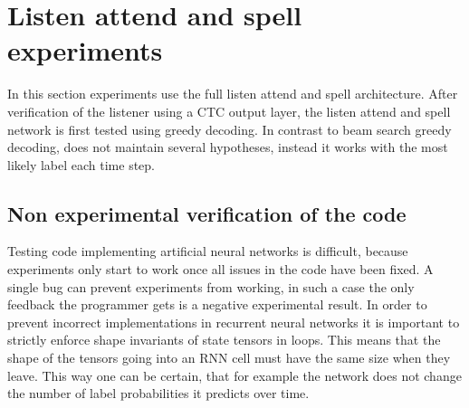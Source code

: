 \section{Listen attend and spell experiments}
In this section experiments use the full listen attend and spell architecture. After verification of the listener using a CTC output layer, the listen attend and spell network is first tested using greedy decoding. In contrast to beam search greedy decoding, does not maintain several hypotheses, instead it works with the most likely label each time step.

\subsection{Non experimental verification of the code}
Testing code implementing artificial neural networks is difficult, because experiments only start to work once all issues in the code have been fixed. A single bug can prevent experiments from working, in such a case the only feedback the programmer gets is a negative experimental result. In order to prevent incorrect implementations in recurrent neural networks it is important to strictly enforce shape invariants of state tensors in loops. This means that the shape of the tensors going into an RNN cell must have the same size when they leave. This way one can be certain, that for example the network does not change the number of label probabilities it predicts over time.

